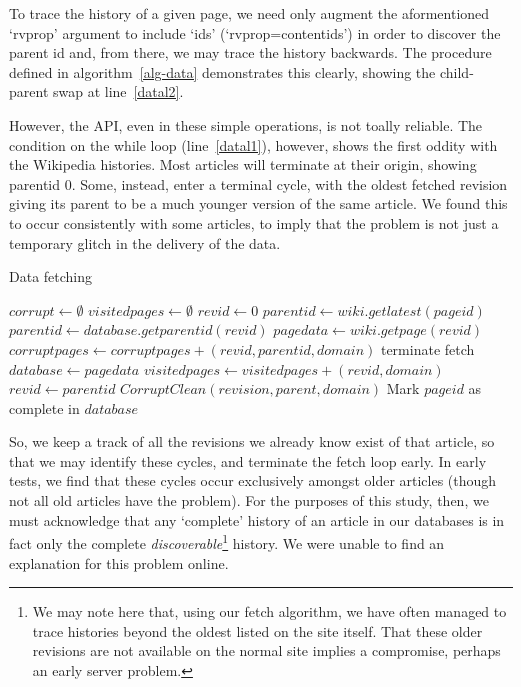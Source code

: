 To trace the history of a given page, we need only augment the
aformentioned `rvprop' argument to include `ids'
(`rvprop=content{\textbar}ids') in order to discover the parent id and, from
there, we may trace the history backwards. The procedure defined in
algorithm~\ref{alg-data} demonstrates this clearly, showing the
child-parent swap at line~\ref{datal2}. 

However, the API, even in these simple operations, is not toally
reliable. The condition on the while loop (line~\ref{datal1}),
however, shows the first oddity with the Wikipedia histories. Most
articles will terminate at their origin, showing parentid 0. Some,
instead, enter a terminal cycle, with the oldest fetched revision
giving its parent to be a much younger version of the same article. We
found this to occur consistently with some articles, to imply that the
problem is not just a temporary glitch in the delivery of the data.

\begin{algorithm}
  \caption{Data fetching}\label{alg-data}
  \begin{algorithmic}
    \State $corrupt \gets \emptyset$
    \State $visitedpages \gets \emptyset$
    \State $revid \gets 0$
    \State $parentid \gets wiki.getlatest(pageid)$
    \label{datal1} 
    \State $parentid \gets database.getparentid(revid)$
    \Else
    \State $pagedata \gets wiki.getpage(revid)$
    \EndIf
    \label{datal3}
    \State $corruptpages \gets corruptpages + (revid, parentid, domain)$
    \Else
    \State terminate fetch\label{data14}
    \EndIf
    \Else
    \State $database \gets page data$
    \EndIf
    \State $visitedpages \gets visitedpages + (revid, domain)$
    \State $revid \gets parentid$\label{datal2}
    \EndWhile
    \State $CorruptClean(revision, parent, domain)$
    \EndFor
    \State Mark $pageid$ as complete in $database$
    \EndProcedure
  \end{algorithmic}
\end{algorithm}

So, we keep a track of all the revisions we already know exist of that
article, so that we may identify these cycles, and terminate the fetch
loop early. In early tests, we find that these cycles occur
exclusively amongst older articles (though not all old articles have
the problem). For the purposes of this study, then, we must
acknowledge that any `complete' history of an article in our databases
is in fact only the complete \textit{discoverable}\footnote{We may
  note here that, using our fetch algorithm, we have often managed to
  trace histories beyond the oldest listed on the site itself. That
  these older revisions are not available on the normal site implies a
  compromise, perhaps an early server problem.}  history. We were
unable to find an explanation for this problem online.

